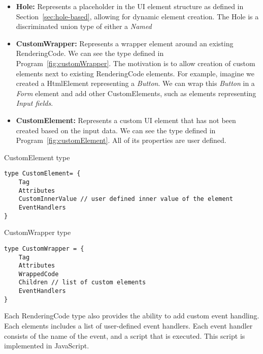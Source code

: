 \begin{itemize}
	\item {\textbf{Hole:} Represents a placeholder in the UI element structure as defined in Section~\ref{sec:hole-based}, allowing for dynamic element creation.
	      The Hole is a discriminated union type of either a \emph{Named}
	      }

	\item {\textbf{CustomWrapper:} Represents a wrapper element around an existing RenderingCode.
	      We can see the type defined in Program~\ref{fig:customWrapper}.
	      The motivation is to allow creation of custom elements next to existing RenderingCode elements.
	      For example, imagine we created a HtmlElement representing a \emph{Button}. We can wrap this \emph{Button} in a \emph{Form} element and add other CustomElements, such as elements representing \emph{Input fields}.
	      }

	\item{\textbf{CustomElement:} Represents a custom UI element that has not been created based on the input data.
	      We can see the type defined in Program~\ref{fig:customElement}.
	      All of its properties are user defined.}

\end{itemize}

\begin{listing}[htbp]
	\caption {CustomElement type}
	\label{fig:customElement}
	\begin{lstlisting}
type CustomElement= {
    Tag
    Attributes
    CustomInnerValue // user defined inner value of the element
    EventHandlers
}
  \end{lstlisting}
\end{listing}

\begin{listing}[htbp]
	\caption {CustomWrapper type}
	\label{fig:customWrapper}
	\begin{lstlisting}
type CustomWrapper = {
    Tag
    Attributes
    WrappedCode
    Children // list of custom elements
    EventHandlers
}
  \end{lstlisting}
\end{listing}

Each RenderingCode type also provides the ability to add custom event handling.
Each elements includes a list of user-defined event handlers.
Each event handler consists of the name of the event, and a script that is executed.
This script is implemented in JavaScript.

